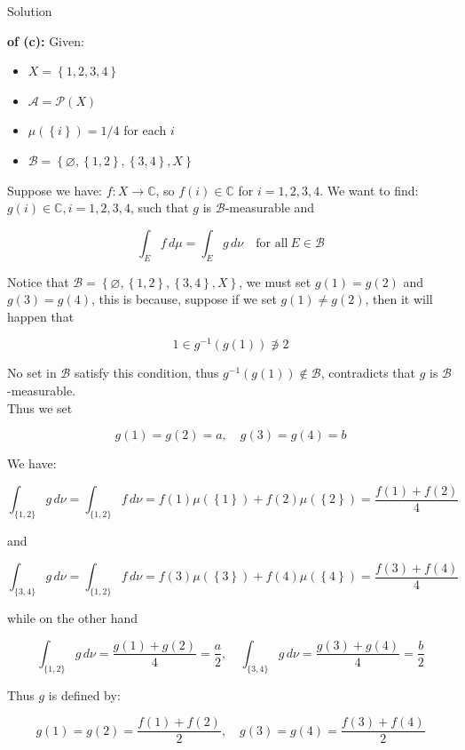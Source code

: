 \begin{qlsolution}{Solution}

\textbf{of (c):} Given:

\begin{itemize}
\item
  \(X = \left\{ {1,2,3,4} \right\}\)
\item
  \(\mathcal{A} = \mathcal{P}(X)\)
\item
  \(\mu(\left\{ i \right\}) = 1/4\) for each \(i\)
\item
  \(\mathcal{B} = \left\{ {\varnothing,\left\{ {1,2} \right\},\left\{ {3,4} \right\},X} \right\}\)
\end{itemize}

Suppose we have: \(f:X\rightarrow\mathbb{C}\), so \(f(i) \in \mathbb{C}\) for \(i = 1,2,3,4\). We want to find: \(g(i) \in \mathbb{C},i = 1,2,3,4\), such that \(g\) is \(\mathcal{B}\)-measurable and

\[\int_{E}f\, d\mu = \int_{E}g\, d\nu\quad\text{for all}\ E \in \mathcal{B}\]

Notice that \(\mathcal{B} = \left\{ {\varnothing,\left\{ {1,2} \right\},\left\{ {3,4} \right\},X} \right\}\), we must set \(g(1) = g(2)\) and \(g(3) = g(4)\), this is because, suppose if we set \(g(1) \neq g(2)\), then it will happen that

\[1 \in g^{- 1}(g(1)) \not\ni 2\]

No set in \(\mathcal{B}\) satisfy this condition, thus \(g^{- 1}(g(1)) \notin \mathcal{B}\), contradicts that \(g\) is \(\mathcal{B}\)-measurable.\\
Thus we set

\[g(1) = g(2) = a,\quad g(3) = g(4) = b\]

We have:

\[\int_{\{{1,2}\}}g\, d\nu = \int_{\{{1,2}\}}f\, d\nu = f(1)\mu(\left\{ 1 \right\}) + f(2)\mu(\left\{ 2 \right\}) = \frac{f(1) + f(2)}{4}\]

and

\[\int_{\{{3,4}\}}g\, d\nu = \int_{\{{1,2}\}}f\, d\nu = f(3)\mu(\left\{ 3 \right\}) + f(4)\mu(\left\{ 4 \right\}) = \frac{f(3) + f(4)}{4}\]

while on the other hand

\[\int_{\{{1,2}\}}g\, d\nu = \frac{g(1) + g(2)}{4} = \frac{a}{2},\quad\int_{\{{3,4}\}}g\, d\nu = \frac{g(3) + g(4)}{4} = \frac{b}{2}\]

Thus \(g\) is defined by:

\[g(1) = g(2) = \frac{f(1) + f(2)}{2},\quad g(3) = g(4) = \frac{f(3) + f(4)}{2}\]


\end{qlsolution}
